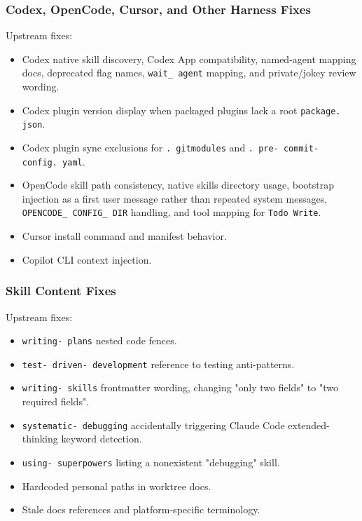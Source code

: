 \documentclass[twocolumn,10pt,letterpaper]{article}
\begin{document}
\subsubsection{Codex, OpenCode, Cursor, and Other Harness Fixes}

Upstream fixes:


\begin{itemize}
\setlength{\itemsep}{0pt}
\setlength{\parskip}{0pt}
  \item Codex native skill discovery, Codex App compatibility, named-agent mapping docs, deprecated flag names, \texttt{wait\_ agent} mapping, and private/jokey review wording.
  \item Codex plugin version display when packaged plugins lack a root \texttt{package. json}.
  \item Codex plugin sync exclusions for \texttt{. gitmodules} and \texttt{. pre- commit- config. yaml}.
  \item OpenCode skill path consistency, native skills directory usage, bootstrap injection as a first user message rather than repeated system messages, \texttt{OPENCODE\_ CONFIG\_ DIR} handling, and tool mapping for \texttt{Todo Write}.
  \item Cursor install command and manifest behavior.
  \item Copilot CLI context injection.
\end{itemize}

\subsubsection{Skill Content Fixes}

Upstream fixes:


\begin{itemize}
\setlength{\itemsep}{0pt}
\setlength{\parskip}{0pt}
  \item \texttt{writing- plans} nested code fences.
  \item \texttt{test- driven- development} reference to testing anti-patterns.
  \item \texttt{writing- skills} frontmatter wording, changing "only two fields" to "two required fields".
  \item \texttt{systematic- debugging} accidentally triggering Claude Code extended-thinking keyword detection.
  \item \texttt{using- superpowers} listing a nonexistent "debugging" skill.
  \item Hardcoded personal paths in worktree docs.
  \item Stale docs references and platform-specific terminology.
\end{itemize}
\end{document}
